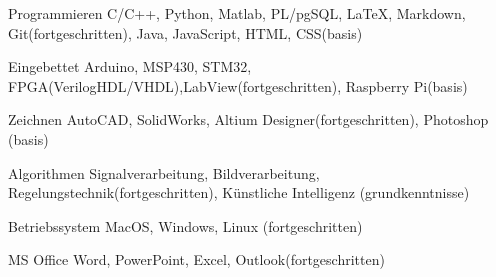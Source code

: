

\begin{cvskills}

  \cvskill
    {Programmieren} %
    {C/C++, Python, Matlab, PL/pgSQL, \LaTeX, Markdown, Git(fortgeschritten), Java, JavaScript, HTML, CSS(basis)} %

  \cvskill
    {Eingebettet} %
    {Arduino, MSP430, STM32,  FPGA(VerilogHDL/VHDL),LabView(fortgeschritten), Raspberry Pi(basis)} %

  \cvskill
    {Zeichnen} %
    {AutoCAD, SolidWorks, Altium Designer(fortgeschritten), Photoshop (basis)} %

  \cvskill
    {Algorithmen} %
    {Signalverarbeitung, Bildverarbeitung, Regelungstechnik(fortgeschritten), Künstliche Intelligenz (grundkenntnisse)} %

  \cvskill
	{Betriebssystem} %
	{MacOS, Windows, Linux (fortgeschritten)} %

  \cvskill
	{MS Office} %
	{Word, PowerPoint, Excel, Outlook(fortgeschritten)} %


\end{cvskills}
